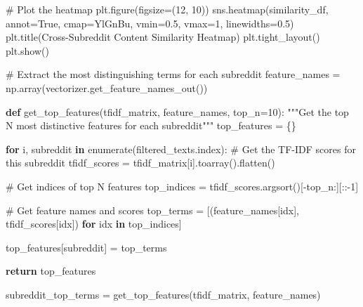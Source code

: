 \documentclass[
  12pt,
  letterpaper,
  DIV=11,
  numbers=noendperiod]{scrartcl}
\newenvironment{Shaded}{\begin{snugshade}}{\end{snugshade}}
\newcommand{\BuiltInTok}[1]{\textcolor[rgb]{0.00,0.23,0.31}{#1}}
\newcommand{\CommentTok}[1]{\textcolor[rgb]{0.37,0.37,0.37}{#1}}
\newcommand{\ControlFlowTok}[1]{\textcolor[rgb]{0.00,0.23,0.31}{\textbf{#1}}}
\newcommand{\DecValTok}[1]{\textcolor[rgb]{0.68,0.00,0.00}{#1}}
\newcommand{\FloatTok}[1]{\textcolor[rgb]{0.68,0.00,0.00}{#1}}
\newcommand{\KeywordTok}[1]{\textcolor[rgb]{0.00,0.23,0.31}{\textbf{#1}}}
\newcommand{\NormalTok}[1]{\textcolor[rgb]{0.00,0.23,0.31}{#1}}
\newcommand{\OperatorTok}[1]{\textcolor[rgb]{0.37,0.37,0.37}{#1}}
\newcommand{\StringTok}[1]{\textcolor[rgb]{0.13,0.47,0.30}{#1}}
\newcommand{\VariableTok}[1]{\textcolor[rgb]{0.07,0.07,0.07}{#1}}
\begin{document}
\begin{Shaded}
\begin{Highlighting}[]
\CommentTok{\# Plot the heatmap}
\NormalTok{plt.figure(figsize}\OperatorTok{=}\NormalTok{(}\DecValTok{12}\NormalTok{, }\DecValTok{10}\NormalTok{))}
\NormalTok{sns.heatmap(similarity\_df, annot}\OperatorTok{=}\VariableTok{True}\NormalTok{, cmap}\OperatorTok{=}\StringTok{\textquotesingle{}YlGnBu\textquotesingle{}}\NormalTok{, vmin}\OperatorTok{=}\FloatTok{0.5}\NormalTok{, vmax}\OperatorTok{=}\DecValTok{1}\NormalTok{, linewidths}\OperatorTok{=}\FloatTok{0.5}\NormalTok{)}
\NormalTok{plt.title(}\StringTok{\textquotesingle{}Cross{-}Subreddit Content Similarity Heatmap\textquotesingle{}}\NormalTok{)}
\NormalTok{plt.tight\_layout()}
\NormalTok{plt.show()}

\CommentTok{\# Extract the most distinguishing terms for each subreddit}
\NormalTok{feature\_names }\OperatorTok{=}\NormalTok{ np.array(vectorizer.get\_feature\_names\_out())}

\KeywordTok{def}\NormalTok{ get\_top\_features(tfidf\_matrix, feature\_names, top\_n}\OperatorTok{=}\DecValTok{10}\NormalTok{):}
    \CommentTok{"""Get the top N most distinctive features for each subreddit"""}
\NormalTok{    top\_features }\OperatorTok{=}\NormalTok{ \{\}}
    
    \ControlFlowTok{for}\NormalTok{ i, subreddit }\KeywordTok{in} \BuiltInTok{enumerate}\NormalTok{(filtered\_texts.index):}
        \CommentTok{\# Get the TF{-}IDF scores for this subreddit}
\NormalTok{        tfidf\_scores }\OperatorTok{=}\NormalTok{ tfidf\_matrix[i].toarray().flatten()}
        
        \CommentTok{\# Get indices of top N features}
\NormalTok{        top\_indices }\OperatorTok{=}\NormalTok{ tfidf\_scores.argsort()[}\OperatorTok{{-}}\NormalTok{top\_n:][::}\OperatorTok{{-}}\DecValTok{1}\NormalTok{]}
        
        \CommentTok{\# Get feature names and scores}
\NormalTok{        top\_terms }\OperatorTok{=}\NormalTok{ [(feature\_names[idx], tfidf\_scores[idx]) }\ControlFlowTok{for}\NormalTok{ idx }\KeywordTok{in}\NormalTok{ top\_indices]}
        
\NormalTok{        top\_features[subreddit] }\OperatorTok{=}\NormalTok{ top\_terms}
    
    \ControlFlowTok{return}\NormalTok{ top\_features}

\NormalTok{subreddit\_top\_terms }\OperatorTok{=}\NormalTok{ get\_top\_features(tfidf\_matrix, feature\_names)}
\end{Highlighting}
\end{Shaded}
\end{document}
